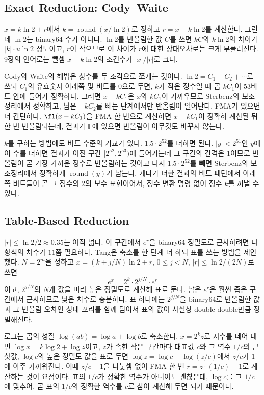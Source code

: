 \subsection{Exact Reduction: Cody--Waite}

$x=k\ln2+r$에서 $k=\operatorname{round}(x/\ln2)$로 정하고 $r=x-k\ln2$를 계산한다. 그런데 $\ln2$는 binary64 수가 아니다. $\ln2$를 반올림한 값 $C$를 쓰면 $kC$와 $k\ln2$의 차이가 $|k|\cdot u\ln2$ 정도이고, $r$이 작으므로 이 차이가 $r$에 대한 상대오차로는 크게 부풀려진다. 9장의 언어로는 뺄셈 $x-k\ln2$의 조건수가 $|x|/|r|$로 크다.

Cody와 Waite의 해법은 상수를 두 조각으로 쪼개는 것이다\cite{cody1980software}. $\ln2=C_1+C_2+\cdots$로 쓰되 $C_1$의 유효숫자 아래쪽 몇 비트를 $0$으로 두면, $k$가 작은 정수일 때 곱 $kC_1$이 $53$비트 안에 들어가 정확하다. 그러면 $x-kC_1$은 $x$와 $kC_1$이 가까우므로 Sterbenz의 보조정리에서 정확하고, 남은 $-kC_2$를 빼는 단계에서만 반올림이 일어난다. FMA가 있으면 더 간단하다. $\fl(x-kC_1)$을 FMA 한 번으로 계산하면 $x-kC_1$이 정확히 계산된 뒤 한 번 반올림되는데, 결과가 $\mathbb F$에 있으면 반올림이 아무것도 바꾸지 않는다.

$k$를 구하는 방법에도 비트 수준의 기교가 있다. $1.5\cdot2^{52}$를 더하면 된다. $|y|<2^{51}$인 $y$에 이 수를 더하면 결과가 이진 구간 $[2^{52},2^{53})$에 들어가는데 그 구간의 간격은 $1$이므로 반올림이 곧 가장 가까운 정수로 반올림하는 것이고 다시 $1.5\cdot2^{52}$를 빼면 Sterbenz의 보조정리에서 정확하게 $\operatorname{round}(y)$가 남는다. 게다가 더한 결과의 비트 패턴에서 아래쪽 비트들이 곧 그 정수의 2의 보수 표현이어서, 정수 변환 명령 없이 정수 $k$를 꺼낼 수 있다.

\subsection{Table-Based Reduction}

$|r|\le\ln2/2\approx0.35$는 아직 넓다. 이 구간에서 $e^r$을 binary64 정밀도로 근사하려면 다항식의 차수가 $11$쯤 필요하다. Tang은 축소를 한 단계 더 하되 표를 쓰는 방법을 제안했다\cite{tang1989exp}. $N=2^m$을 정하고 $x=(k+j/N)\ln2+r$, $0\le j<N$, $|r|\le\ln2/(2N)$로 쓰면
\[
e^x=2^k\cdot2^{j/N}\cdot e^r
\]
이고, $2^{j/N}$의 $N$개 값을 미리 높은 정밀도로 계산해 표로 둔다. 남은 $e^r$은 훨씬 좁은 구간에서 근사하므로 낮은 차수로 충분하다. 표 하나에는 $2^{j/N}$을 binary64로 반올림한 값과 그 반올림 오차인 상대 꼬리를 함께 담아서 표의 값이 사실상 double-double만큼 정밀해진다.

로그는 곱의 성질 $\log(ab)=\log a+\log b$로 축소한다. $x=2^kz$로 지수를 떼어 내면 $\log x=k\log2+\log z$이고, $z$가 속한 작은 구간마다 대표값 $c$와 그 역수 $1/c$의 근삿값, $\log c$의 높은 정밀도 값을 표로 두면 $\log z=\log c+\log(z/c)$에서 $z/c$가 $1$에 아주 가까워진다. 이때 $z/c-1$을 나눗셈 없이 FMA 한 번 $r=z\cdot(1/c)-1$로 계산하는 것이 요점이다. 표의 $1/c$가 정확한 역수가 아니어도 괜찮은데, $\log c$를 그 $1/c$에 맞추어, 곧 표의 $1/c$의 정확한 역수를 $c$로 삼아 계산해 두면 되기 때문이다.


